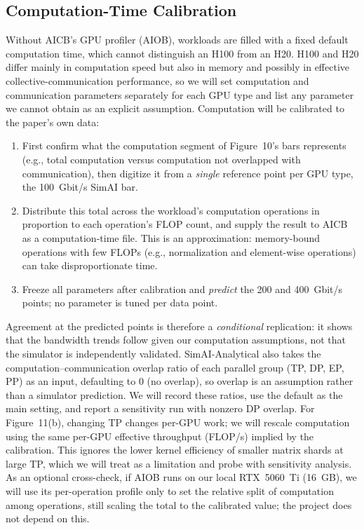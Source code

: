 \documentclass[letterpaper,twocolumn,10pt]{article}
\begin{document}
\subsection{Computation-Time Calibration}
Without AICB's GPU profiler (AIOB), workloads are filled with a fixed default computation time, which cannot distinguish an H100 from an H20. H100 and H20 differ mainly in computation speed but also in memory and possibly in effective collective-communication performance, so we will set computation and communication parameters separately for each GPU type and list any parameter we cannot obtain as an explicit assumption. Computation will be calibrated to the paper's own data:
\begin{enumerate}[leftmargin=*,itemsep=1pt,topsep=2pt]
\item First confirm what the computation segment of Figure~10's bars represents (e.g., total computation versus computation not overlapped with communication), then digitize it from a \emph{single} reference point per GPU type, the 100~Gbit/s SimAI bar.
\item Distribute this total across the workload's computation operations in proportion to each operation's FLOP count, and supply the result to AICB as a computation-time file. This is an approximation: memory-bound operations with few FLOPs (e.g., normalization and element-wise operations) can take disproportionate time.
\item Freeze all parameters after calibration and \emph{predict} the 200 and 400~Gbit/s points; no parameter is tuned per data point.
\end{enumerate}
Agreement at the predicted points is therefore a \emph{conditional} replication: it shows that the bandwidth trends follow given our computation assumptions, not that the simulator is independently validated. SimAI-Analytical also takes the computation--communication overlap ratio of each parallel group (TP, DP, EP, PP) as an input, defaulting to 0 (no overlap), so overlap is an assumption rather than a simulator prediction. We will record these ratios, use the default as the main setting, and report a sensitivity run with nonzero DP overlap. For Figure~11(b), changing TP changes per-GPU work; we will rescale computation using the same per-GPU effective throughput (FLOP/s) implied by the calibration. This ignores the lower kernel efficiency of smaller matrix shards at large TP, which we will treat as a limitation and probe with sensitivity analysis. As an optional cross-check, if AIOB runs on our local RTX~5060~Ti (16~GB), we will use its per-operation profile only to set the relative split of computation among operations, still scaling the total to the calibrated value; the project does not depend on this.
\end{document}
